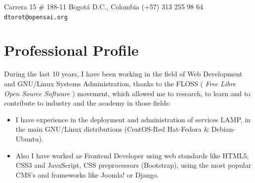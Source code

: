 \documentclass[overlapped,line,final]{res}
\begin{document}

\begin{resume}


	\begin{minipage}{0.5\linewidth}
    		Carrera 15 \# 188-11  \newline 
    		Bogotá D.C., Colombia \newline
    		(+57) 313 255 98 64 \newline
    		{\tt dtorot@opensai.org}
	\end{minipage}


\vspace{0.5cm}
\section{\sc Professional Profile}
\vspace{0.5cm}
During the last 10 years, I have been working in the field of Web Development and GNU/Linux Systems Administration, thanks to the FLOSS ( {\em Free Libre Open Source Software } ) movement, which allowed me to research, to learn and to contribute to industry and the academy in those fields:

\vspace{2mm}
\begin{itemize}
    \item I have experience in the deployment and administration of services LAMP, in the main GNU/Linux distributions (CentOS-Red Hat-Fedora \& Debian-Ubuntu). 

    \item Also I have worked as Frontend Developer using web standards like HTML5, CSS3 and JavaScript, CSS preprocessors (Bootstrap), using the most popular CMS's and frameworks like Joomla! or Django.


\end{itemize}
\end{resume}
\end{document}
